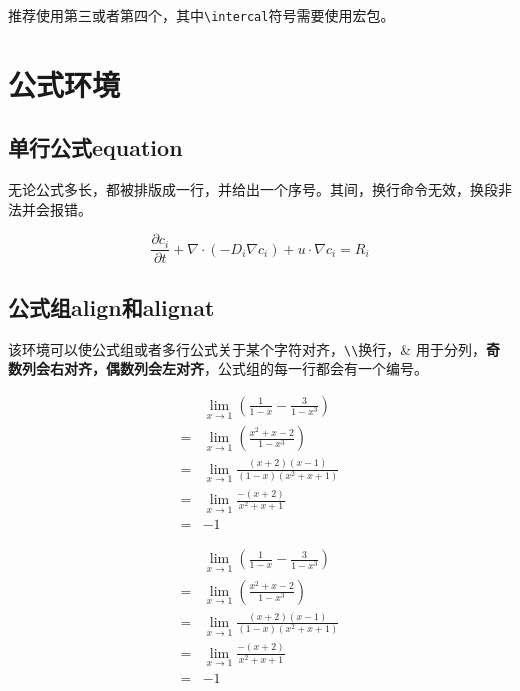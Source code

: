 推荐使用第三或者第四个，其中\lstinline|\intercal|符号需要使用宏包。


\section{公式环境}

\subsection{单行公式equation}

无论公式多长，都被排版成一行，并给出一个序号。其间，换行命令无效，换段非法并会报错。

\begin{codeshow}
\begin{equation}
\frac{\partial c_i}{\partial t}+\nabla \cdot (-D_{i} \nabla c_{i})+u \cdot \nabla c_{i}=R_i
\end{equation}
\end{codeshow}



\subsection{公式组align和alignat}

该环境可以使公式组或者多行公式关于某个字符对齐，\lstinline|\\|换行，\& 用于分列，\textbf{奇数列会右对齐，偶数列会左对齐}，公式组的每一行都会有一个编号。

\begin{latex}
\begin{align}
&\lim\limits_{x\to 1}\left(\frac{1}{1-x}-\frac{3}{1-x^3}\right)\\
= &\lim\limits_{x\to 1}\left(\frac{x^2+x-2}{1-x^3}\right)  \\
= & \lim\limits_{x\to 1}\frac{(x+2)(x-1)}{(1-x)(x^2+x+1)}\\
= & \lim\limits_{x\to 1}\frac{-(x+2)}{x^2+x+1}\\
= & -1
\end{align}
\end{latex}

\begin{align}\label{align-lim}
&\lim\limits_{x\to 1}\left(\frac{1}{1-x}-\frac{3}{1-x^3}\right)\\
= &\lim\limits_{x\to 1}\left(\frac{x^2+x-2}{1-x^3}\right)  \\
= & \lim\limits_{x\to 1}\frac{(x+2)(x-1)}{(1-x)(x^2+x+1)}\\
= & \lim\limits_{x\to 1}\frac{-(x+2)}{x^2+x+1}\\
= & -1
\end{align}


